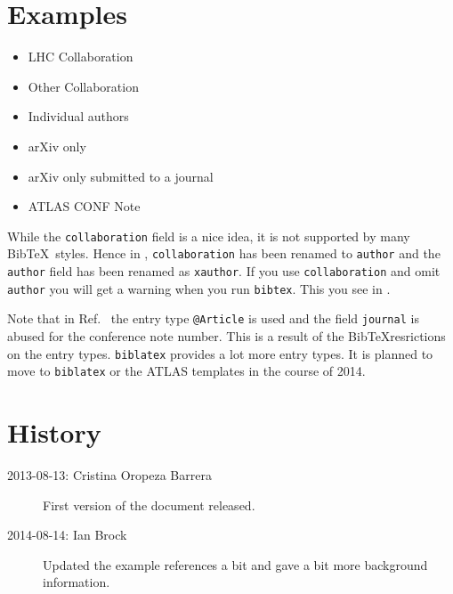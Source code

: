 \documentclass{../atlasnote}
\newcommand*{\BibTeX}{Bib\TeX}
\begin{document}
\section{Examples}

\begin{itemize}
	\item LHC Collaboration~\cite{lhcCollaboration:2012}
	\item Other Collaboration~\cite{otherCollaboration:2007}
	\item Individual authors~\cite{authors:2008}
	\item arXiv only~\cite{arxivOnly:2009}
	\item arXiv only submitted to a journal~\cite{arxivSub:2011}
	\item ATLAS CONF Note~\cite{atlasConf:2012} 
\end{itemize}

While the \texttt{collaboration} field is a nice idea, it is not supported by many \BibTeX\ styles.
Hence in \cite{lhcCollaboration:2012}, \texttt{collaboration} has been renamed to \texttt{author} and
the \texttt{author} field has been renamed as \texttt{xauthor}. If you use \texttt{collaboration} and omit
\texttt{author} you will get a warning when you run \texttt{bibtex}. This you see in \cite{atlasConf:2012}.

Note that in Ref.~\cite{atlasConf:2012} the entry type \texttt{@Article} is used and the field \texttt{journal} 
is abused for the conference note number. This is a result of the \BibTeX resrictions on the entry types.
\texttt{biblatex} provides a lot more entry types. It is planned to move to \texttt{biblatex} or the ATLAS templates
in the course of 2014.


\section*{History}

\begin{description}
  \item[2013-08-13: Cristina Oropeza Barrera] First version of the document released.
  \item[2014-08-14: Ian Brock] Updated the example references a bit and gave a bit more background information.
\end{description}



\end{document}
